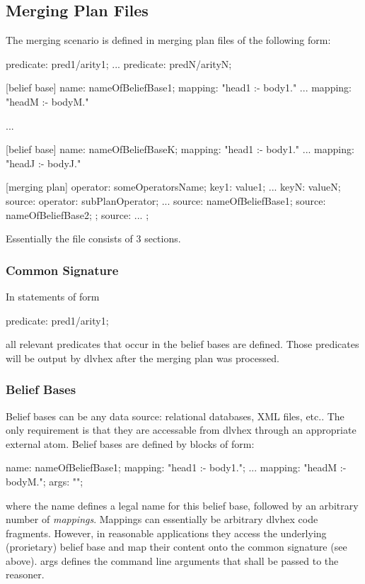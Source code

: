 \documentclass[a4paper,11pt]{article}
\theoremstyle{definition}
\newcommand{\dlvhex}{\textsf{dlvhex}\xspace }
\newcommand{\inlinecode}[1]{\textsf{#1}\xspace }
\begin{document}
		\subsection{Merging Plan Files}
		\label{sec:RPCompiler:Files}
		
			The merging scenario is defined in merging plan files of the following form:
			
			\begin{exampleprogram}
predicate: pred1/arity1;
...
predicate: predN/arityN;

[belief base]
name: nameOfBeliefBase1;
mapping: "head1 :- body1."
...
mapping: "headM :- bodyM."

...

[belief base]
name: nameOfBeliefBaseK;
mapping: "head1 :- body1."
...
mapping: "headJ :- bodyJ."

[merging plan]
{
	operator: someOperatorsName;
	key1: value1;
	...
	keyN: valueN;
	source: {
		operator: subPlanOperator;
		...
		source: {nameOfBeliefBase1};
		source: {nameOfBeliefBase2};
	};
	source: {
		...
	};
}
			\end{exampleprogram}

			Essentially the file consists of 3 sections.
			
			\subsubsection{Common Signature}
			
				In statements of form
				\begin{center}
					\inlinecode{predicate: pred1/arity1;}
				\end{center}
				all relevant predicates that occur in the belief bases are defined. Those predicates will be output by \dlvhex after the merging plan was processed.

			\subsubsection{Belief Bases}
			
				Belief bases can be any data source: relational databases, XML files, etc.. The only requirement is that they are accessable from \dlvhex through an
				appropriate external atom. Belief bases are defined by blocks of form:
				\begin{exampleprogram}
name: nameOfBeliefBase1;
mapping: "head1 :- body1.";
...
mapping: "headM :- bodyM.";
args: "";
				\end{exampleprogram}
				where the \inlinecode{name} defines a legal name for this belief base, followed by an arbitrary number of \emph{mappings}. Mappings can essentially be arbitrary \dlvhex
				code fragments. However, in reasonable applications they access the underlying (prorietary) belief base and map their content onto the common signature (see above).
				\inlinecode{args} defines the command line arguments that shall be passed to the reasoner.
				
\end{document}

